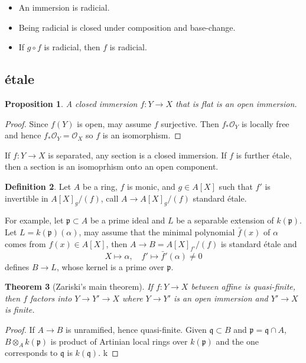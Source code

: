 \documentclass[leqno]{amsart}
\newcommand{\oo}{\mathcal O}
\newcommand{\1}{\mathbf{1}}
\newcommand{\fp}{\mathfrak p}
\newcommand{\fq}{\mathfrak q}
\newtheorem{thm}{Theorem}[section]
\newtheorem{prop}[thm]{Proposition}
\theoremstyle{definition}
\newtheorem{defn}[thm]{Definition}
\theoremstyle{remark}
\begin{document}
\begin{itemize}
	\item An immersion is radicial.
	\item Being radicial is closed under composition
		and base-change.
	\item If $g\circ f$ is radicial, then $f$ is radicial.
\end{itemize}

\subsection{\'{e}tale}

\begin{prop}
	A closed immersion 
	$f\colon Y\to X$  that is flat
	is an open immersion.
\end{prop}
\begin{proof}
	Since $f(Y)$ is open, may assume $f$ surjective.
	Then  $f_*\oo_Y$ is locally free
	and hence  $f_*\oo_Y=\oo_X$
	so  $f$ is an isomorphism.
\end{proof}
If $f\colon Y\to X$ is separated,
any section is a closed immersion.
If  $f$ is further  \'{e}tale,
then a section is an isomoprhism 
onto an open component.

\begin{defn}
	Let $A$ be a ring,
	 $f$ is monic,
	 and  $g\in A[X]$
	 such that  $f'$
	 is invertible in  $A[X]_g/(f)$,
	 call  $A\to A[X]_g/(f)$
	 standard  \'{e}tale.
\end{defn}

For example,
let $\fp\subset A$
be a prime ideal
and  $L$ be a separable extension
of  $k(\fp)$.
Let  $L=k(\fp)(\alpha)$,
may assume that 
the minimal polynomial  $\bar{f}(x)$ 
of $\alpha$ comes from  $f(x)\in A[X]$,
then  $A\to B=A[X]_{f'}/(f)$ is standard \'{e}tale
and 
\[
	X\mapsto \alpha,
	\quad f'\mapsto \bar{f}'(\alpha)\neq 0
\]
defines $B\to L$,
whose kernel is a prime over $\fp$.


\begin{thm}[Zariski's main theorem]
	If $f\colon Y\to X$
	between affine is quasi-finite,
	then  $f$ factors into
	 $Y\to Y'\to X$
	 where  $Y\to Y'$ is an open immersion
	 and  $Y'\to X$ is finite.
\end{thm}

\begin{proof}
	If $A\to B$ is unramified,
	hence quasi-finite.
	Given  $\fq\subset B$
	and  $\fp=\fq\cap A$,
	$B\otimes_Ak(\fp)$
	is product of Artinian local rings over  $k(\fp)$
	and the one corresponds to  $\fq$ is  $k(\fq)$.
	k
\end{proof}
\end{document}
